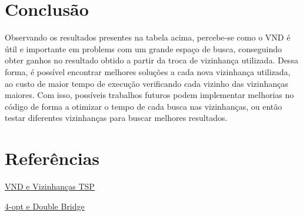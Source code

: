 \documentclass[10pt]{extarticle} %
\begin{document}
\section{Conclusão}

Observando os resultados presentes na tabela acima, percebe-se como o VND é útil e importante em problems com um grande espaço de busca, conseguindo obter ganhos no resultado obtido a partir da troca de vizinhança utilizada. Dessa forma, é possível encontrar melhores soluções a cada nova vizinhança utilizada, ao custo de maior tempo de execução verificando cada vizinho das vizinhanças maiores. Com isso, possíveis trabalhos futuros podem implementar melhorias no código de forma a otimizar o tempo de cada busca nas vizinhanças, ou então testar diferentes vizinhanças para buscar melhores resultados.

\section{Referências}

\noindent \href{https://www.ime.unicamp.br/~chico/mt852/slidesvns.pdf}{VND e Vizinhanças TSP}

\noindent \href{https://tsp-basics.blogspot.com/2017/04/4-opt-and-double-bridge.html}{4-opt e Double Bridge}
\end{document}

